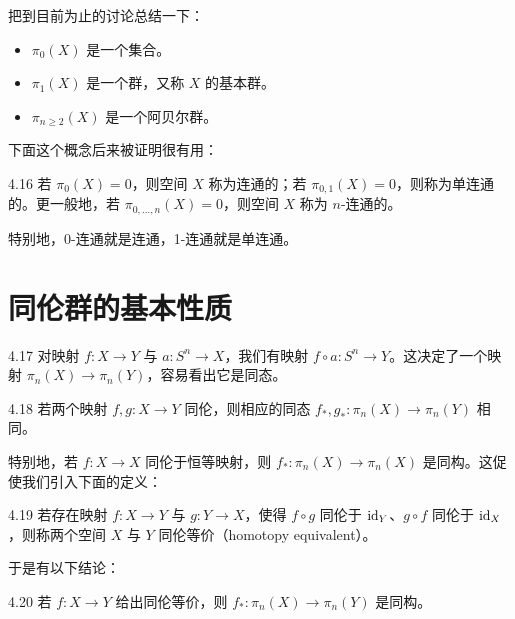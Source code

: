 把到目前为止的讨论总结一下：

\begin{itemize}
  \item $\pi_0(X)$ 是一个集合。
  \item $\pi_1(X)$ 是一个群，又称 $X$ 的基本群。
  \item $\pi_{n\ge2}(X)$ 是一个阿贝尔群。
\end{itemize}

下面这个概念后来被证明很有用：

\begin{definition}{4.16}
若 $\pi_0(X)=0$，则空间 $X$ 称为连通的；若 $\pi_{0,1}(X)=0$，则称为单连通的。更一般地，若 $\pi_{0,\dots,n}(X)=0$，则空间 $X$ 称为 $n$-连通的。
\end{definition}

特别地，0-连通就是连通，1-连通就是单连通。


\section{同伦群的基本性质}

\begin{definition}{4.17}
对映射 $f:X\to Y$ 与 $a:S^n\to X$，我们有映射 $f\circ a:S^n\to Y$。这决定了一个映射 $\pi_n(X)\to\pi_n(Y)$，容易看出它是同态。
\end{definition}

\begin{proposition}{4.18}
若两个映射 $f,g:X\to Y$ 同伦，则相应的同态 $f_\ast,g_\ast:\pi_n(X)\to\pi_n(Y)$ 相同。
\end{proposition}

特别地，若 $f:X\to X$ 同伦于恒等映射，则 $f_\ast:\pi_n(X)\to\pi_n(X)$ 是同构。这促使我们引入下面的定义：

\begin{definition}{4.19}
若存在映射 $f:X\to Y$ 与 $g:Y\to X$，使得 $f\circ g$ 同伦于 $\mathrm{id}_Y$、$g\circ f$ 同伦于 $\mathrm{id}_X$，则称两个空间 $X$ 与 $Y$ 同伦等价（homotopy equivalent）。
\end{definition}

于是有以下结论：

\begin{proposition}{4.20}
若 $f:X\to Y$ 给出同伦等价，则 $f_\ast:\pi_n(X)\to\pi_n(Y)$ 是同构。
\end{proposition}

